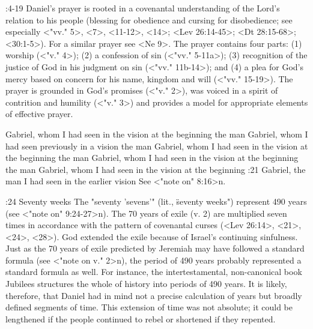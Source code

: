 :4-19 {}  Daniel's prayer is rooted in a covenantal understanding of the Lord's relation to his people (blessing for obedience and cursing for disobedience; see especially <"vv." 5>, <7>, <11-12>, <14>; <Lev 26:14-45>;  <Dt 28:15-68>; <30:1-5>). For a similar prayer see <Ne 9>. The prayer contains four parts: (1) worship (<"v." 4>); (2) a confession of sin  (<"vv." 5-11a>); (3) recognition of the justice of God in his judgment on sin 
(<"vv." 11b-14>); %
and (4) a plea for God's mercy based on concern for his name, kingdom and will (<"vv." 15-19>). The prayer is grounded  
in God's promises (<"v." 2>), was voiced in a spirit of contrition and humility (<"v." 3>) and provides a model for appropriate elements of effective prayer. 

    {Gabriel, whom I had seen in the vision at the beginning} %
    {the man Gabriel, whom I had seen previously in a vision} %
    {the man Gabriel, whom I had seen in the vision at the beginning} %
    {the man Gabriel, whom I had seen in the vision at the beginning} %
    {the man Gabriel, whom I had seen in the vision at the beginning} %
:21 {Gabriel, the man I had seen in the earlier vision} See <"note on" 8:16>n.

:24 {Seventy weeks} The "seventy 'sevens'" (lit., \"seventy 
weeks") represent 490 years (see <"note on" 9:24-27>n). The 70 years of 
exile (v. 2) are multiplied seven times in accordance with the pattern of covenantal curses
(<Lev 26:14>, <21>, <24>, <28>). God extended the  exile because of Israel's continuing sinfulness. Just as the 70 years 
of exile predicted by Jeremiah may have followed a standard formula (see <"note on v." 2>n), the period 
of 490 years probably represented a standard formula as well. For instance, the intertestamental,
non-canonical book Jubilees structures the whole of history  
into periods of 490 years. It is likely, therefore, that Daniel had in 
mind not a precise calculation of years but broadly defined segments of time. This extension of time
was not absolute; it could be  lengthened if the people continued to rebel or shortened if they 
repented.

